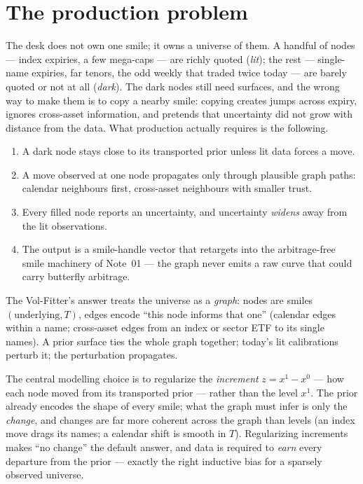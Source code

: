 \documentclass[11pt]{article}
\begin{document}
\tableofcontents
\newpage

\section{The production problem}
\label{sec:problem}

The desk does not own one smile; it owns a universe of them. A handful of nodes
--- index expiries, a few mega-caps --- are richly quoted (\emph{lit}); the rest
--- single-name expiries, far tenors, the odd weekly that traded twice today ---
are barely quoted or not at all (\emph{dark}). The dark nodes still need
surfaces, and the wrong way to make them is to copy a nearby smile: copying
creates jumps across expiry, ignores cross-asset information, and pretends that
uncertainty did not grow with distance from the data. What production actually
requires is the following.

\begin{invariant}
\begin{enumerate}[leftmargin=1.6em]
\item A dark node stays close to its transported prior unless lit data forces a
move.
\item A move observed at one node propagates only through plausible graph paths:
calendar neighbours first, cross-asset neighbours with smaller trust.
\item Every filled node reports an uncertainty, and uncertainty \emph{widens}
away from the lit observations.
\item The output is a smile-handle vector that retargets into the arbitrage-free
smile machinery of Note~01 --- the graph never emits a raw curve that could carry
butterfly arbitrage.
\end{enumerate}
\end{invariant}

The Vol-Fitter's answer treats the universe as a \emph{graph}: nodes are smiles
$(\text{underlying},T)$, edges encode ``this node informs that one'' (calendar
edges within a name; cross-asset edges from an index or sector ETF to its single
names). A prior surface ties the whole graph together; today's lit calibrations
perturb it; the perturbation propagates.

\begin{heuristic}
The central modelling choice is to regularize the \emph{increment}
$z=x^1-x^0$ --- how each node moved from its transported prior --- rather than
the level $x^1$. The prior already encodes the shape of every smile; what the
graph must infer is only the \emph{change}, and changes are far more coherent
across the graph than levels (an index move drags its names; a calendar shift is
smooth in $T$). Regularizing increments makes ``no change'' the default answer,
and data is required to \emph{earn} every departure from the prior --- exactly
the right inductive bias for a sparsely observed universe.
\end{heuristic}
\end{document}
